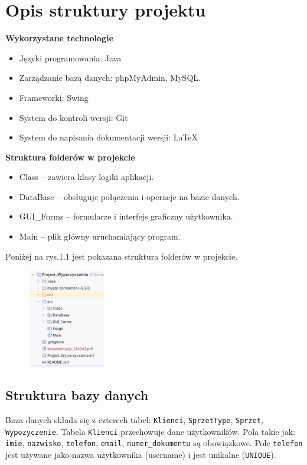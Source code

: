 \newpage
\section{Opis struktury projektu}
\textbf{Wykorzystane technologie}
\begin{itemize}
    \item Języki programowania: Java
    \item Zarządzanie bazą danych: phpMyAdmin, MySQL.
    \item Frameworki: Swing
    \item System do kontroli wersji: Git
    \item System do napisania dokumentacji wersji: \LaTeX
\end{itemize}

\textbf{Struktura folderów w projekcie}
\begin{itemize}
    \item Class – zawiera klasy logiki aplikacji.
    \item DataBase – obsługuje połączenia i operacje na bazie danych.
    \item GUI\_Forms – formularze i interfejs graficzny użytkownika.
    \item Main – plik główny uruchamiający program.
\end{itemize}
Poniżej na rys.1.1 jest pokazana struktura folderów w projekcie.
\begin{figure}[h]
    \centering
    \includegraphics[width=0.3\textwidth]{figures/struktura_projektu.jpg}
    \caption{}
\end{figure} 

\subsection{Struktura bazy danych}
Baza danych składa się z czterech tabel: \texttt{Klienci}, \texttt{SprzetType}, \texttt{Sprzet}, \texttt{Wypozyczenie}. 
Tabela \texttt{Klienci} przechowuje dane użytkowników. Pola takie jak: \texttt{imie}, \texttt{nazwisko}, \texttt{telefon}, \texttt{email}, \texttt{numer\_dokumentu} są obowiązkowe. 
Pole \texttt{telefon} jest używane jako nazwa użytkownika (username) i jest unikalne (\texttt{UNIQUE}).

